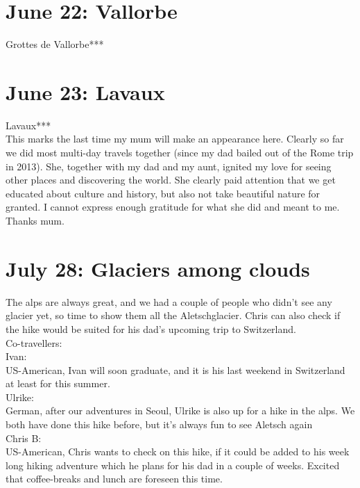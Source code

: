 \section{June 22: Vallorbe}
\label{Vallorbe2019}

Grottes de Vallorbe***

\section{June 23: Lavaux}
\label{Valaux2019}

Lavaux***\\

This marks the last time my mum will make an appearance here. Clearly so far we did most multi-day travels together (since my dad bailed out of the Rome trip in 2013). She, together with my dad and my aunt, ignited my love for seeing other places and discovering the world. She clearly paid attention that we get educated about culture and history, but also not take beautiful nature for granted. I cannot express enough gratitude for what she did and meant to me. Thanks mum.

\section{July 28: Glaciers among clouds}
\label{2019:Fiesch}

The alps are always great, and we had a couple of people who didn't see any glacier yet, so time to show them all the Aletschglacier. Chris can also check if the hike would be suited for his dad's upcoming trip to Switzerland.\\

Co-travellers:\\
Ivan:\\
US-American, Ivan will soon graduate, and it is his last weekend in Switzerland at least for this summer.\\

Ulrike:\\
German, after our adventures in Seoul, Ulrike is also up for a hike in the alps. We both have done this hike before, but it's always fun to see Aletsch again\\

Chris B:\\
US-American, Chris wants to check on this hike, if it could be added to his week long hiking adventure which he plans for his dad in a couple of weeks. Excited that coffee-breaks and lunch are foreseen this time.\\

